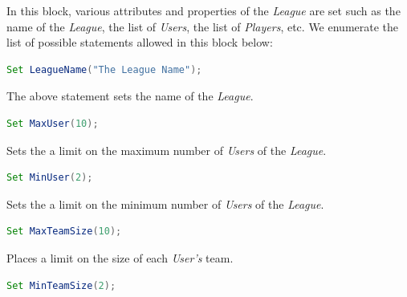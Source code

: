 \documentclass[12pt]{report}
\begin{document}
In this block, various attributes and properties of the \textit{League} are set such as the name of the \textit{League}, the list of \textit{Users}, the list of \textit{Players}, etc. We enumerate the list of possible statements allowed in this block below:

\begin{singlespace}
\begin{lstlisting}[language=Java,label=some-code,caption={Setting league name.}]
Set LeagueName("The League Name");
\end{lstlisting}
\end{singlespace}

The above statement sets the name of the \textit{League}.

\begin{singlespace}
\begin{lstlisting}[language=Java,label=some-code,caption={Setting maximun number of \texttt{Users}.}]
Set MaxUser(10);
\end{lstlisting}
\end{singlespace}

Sets the a limit on the maximum number of \textit{Users} of the \textit{League}.

\begin{singlespace}
\begin{lstlisting}[language=Java,label=some-code,caption={Setting minimum number of \texttt{Users}.}]
Set MinUser(2);
\end{lstlisting}
\end{singlespace}

Sets the a limit on the minimum number of \textit{Users} of the \textit{League}.

\begin{singlespace}
\begin{lstlisting}[language=Java,label=some-code,caption={Setting maximum size of each team.}]
Set MaxTeamSize(10);
\end{lstlisting}
\end{singlespace}

Places a limit on the size of each \textit{User's} team.

\begin{singlespace}
\begin{lstlisting}[language=Java,label=some-code,caption={Setting minimum size of each team.}]
Set MinTeamSize(2);
\end{lstlisting}
\end{singlespace}
\end{document}
